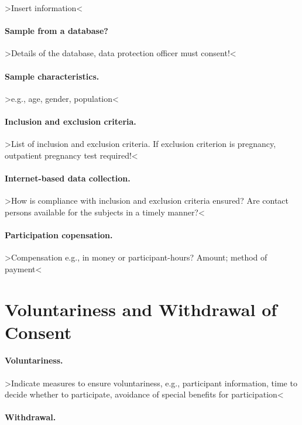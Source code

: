 \documentclass[11pt,twoside,a4paper]{article}
\begin{document}
>Insert information<

\paragraph{Sample from a database?}

>Details of the database, data protection officer must consent!<

\paragraph{Sample characteristics.}

>e.g., age, gender, population<

\paragraph{Inclusion and exclusion criteria.}

>List of inclusion and exclusion criteria. If exclusion criterion is pregnancy, outpatient pregnancy test required!<

\paragraph{Internet-based data collection.}

>How is compliance with inclusion and exclusion criteria ensured? Are contact persons available for the subjects in a timely manner?<

\paragraph{Participation copensation.}

>Compensation e.g., in money or participant-hours? Amount; method of payment<

\section{Voluntariness and Withdrawal of Consent}

\paragraph{Voluntariness.}

>Indicate measures to ensure voluntariness, e.g., participant information, time to decide whether to participate, avoidance of special benefits for participation<

\paragraph{Withdrawal.}
\end{document}
